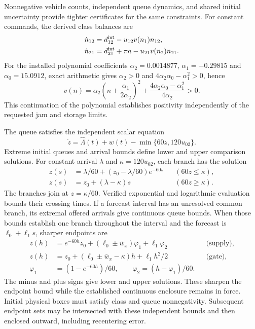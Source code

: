 \documentclass[preprint,12pt]{elsarticle}
\begin{document}
Nonnegative vehicle counts, independent queue dynamics, and shared
initial uncertainty provide tighter certificates for the same constraints.
For constant commands, the derived class balances are
\begin{equation}
 \begin{aligned}
 \dot n_{12}&=d^{\rm int}_{12}-u_{12}v(n_1)n_{12},\\
 \dot n_{21}&=d^{\rm int}_{21}+\pi a-u_{21}v(n_2)n_{21}.
 \end{aligned}
 \label{eq:structure-derived-classes}
\end{equation}
For the installed polynomial coefficients $\alpha_2=0.0014877$,
$\alpha_1=-0.29815$ and $\alpha_0=15.0912$, exact arithmetic gives
$\alpha_2>0$ and $4\alpha_2\alpha_0-\alpha_1^2>0$, hence
\begin{equation}
 v(n)=\alpha_2\left(n+\frac{\alpha_1}{2\alpha_2}\right)^2+
                    \frac{4\alpha_2\alpha_0-\alpha_1^2}{4\alpha_2}>0.
 \label{eq:structure-positive-factor}
\end{equation}
This continuation of the polynomial establishes positivity independently
of the requested jam and storage limits.

The queue satisfies the independent scalar equation
\begin{equation}
 \dot z=\widehat\Lambda(t)+w(t)-\min\{60z,120u_{02}\}.
 \label{eq:structure-scalar-queue}
\end{equation}
Extreme initial queues and arrival bounds define lower and upper
comparison solutions. For constant arrival $\lambda$ and
$\kappa=120u_{02}$, each branch has the solution
\begin{equation}
 \begin{aligned}
 z(s)&=\lambda/60+(z_0-\lambda/60)e^{-60s}&&(60z\le \kappa),\\
 z(s)&=z_0+(\lambda-\kappa)s&&(60z\ge \kappa).
 \end{aligned}
 \label{eq:structure-queue-flows}
\end{equation}
The branches join at $z=\kappa/60$. Verified exponential and logarithmic
evaluation bounds their crossing times. If a forecast interval has an
unresolved common branch, its extremal offered arrivals give continuous
queue bounds. When those bounds establish one branch throughout the
interval and the forecast is $\ell_0+\ell_1s$, sharper endpoints are
\begin{equation}
\begin{aligned}
 z(h)&=e^{-60h}z_0+(\ell_0\pm\bar w_x)\varphi_1+\ell_1\varphi_2
       &&\text{(supply)},\\
 z(h)&=z_0+(\ell_0\pm\bar w_x-\kappa)h+\ell_1h^2/2
       &&\text{(gate)},\\
 \varphi_1&=(1-e^{-60h})/60,\qquad
 \varphi_2=(h-\varphi_1)/60.
\end{aligned}
\end{equation}
The minus and plus signs give lower and upper solutions. These sharpen
the endpoint bound while the established continuous enclosure remains
in force. Initial physical boxes must satisfy class and queue
nonnegativity. Subsequent endpoint sets may be intersected with these
independent bounds and then enclosed outward, including recentering error.
\end{document}
